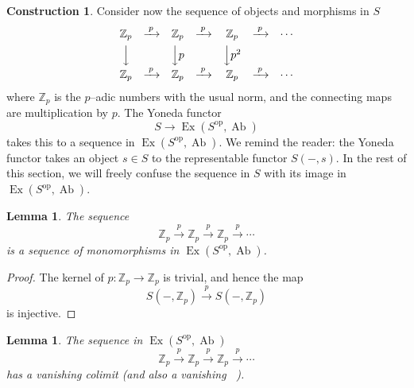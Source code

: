 \documentclass[11pt,a4paper]{article}
\theoremstyle{plain}
\newtheorem{lemma}[theorem]{Lemma}
\theoremstyle{definition}
\newtheorem{construction}[theorem]{Construction}
\DeclareMathOperator{\colim}{colim}
\DeclareMathOperator{\colimone}{\colim\nolimits^{1}}
\DeclareMathOperator{\Ex}{Ex}
\DeclareMathOperator{\Ab}{Ab}
\newcommand{\op}{\mathrm{op}}
\numberwithin{equation}{section}
\begin{document}
\begin{construction}\label{cons3.9}
Consider now the sequence of objects and morphisms in $S$
\begin{equation*}
\begin{array}{ccccccccc}
\mathbb{Z}_{p} & \xrightarrow{\;p\;} & \mathbb{Z}_{p} & \xrightarrow{\;p\;} & \mathbb{Z}_{p} & \xrightarrow{\;p\;} & \cdots \\[4pt]
\Big\downarrow & & \Big\downarrow p & & \Big\downarrow p^{2} \\[4pt]
\mathbb{Z}_{p} & \xrightarrow{\;p\;} & \mathbb{Z}_{p} & \xrightarrow{\;p\;} & \mathbb{Z}_{p} & \xrightarrow{\;p\;} & \cdots
\end{array}
\end{equation*}
where $\mathbb{Z}_{p}$ is the $p$--adic numbers with the usual norm, and the connecting maps are multiplication by $p$. The Yoneda functor
\begin{equation*}
S \longrightarrow \Ex(S^{\op},\Ab)
\end{equation*}
takes this to a sequence in $\Ex(S^{\op},\Ab)$. We remind the reader: the Yoneda functor takes an object $s \in S$ to the representable functor $S(-,s)$. In the rest of this section, we will freely confuse the sequence in $S$ with its image in $\Ex(S^{\op},\Ab)$.
\end{construction}

\begin{lemma}\label{lem3.10}
The sequence
\begin{equation*}
\mathbb{Z}_{p} \xrightarrow{\;p\;} \mathbb{Z}_{p} \xrightarrow{\;p\;} \mathbb{Z}_{p} \xrightarrow{\;p\;} \cdots
\end{equation*}
is a sequence of monomorphisms in $\Ex(S^{\op},\Ab)$.
\end{lemma}

\begin{proof}
The kernel of $p: \mathbb{Z}_{p} \to \mathbb{Z}_{p}$ is trivial, and hence the map
\begin{equation*}
S(-,\mathbb{Z}_{p}) \xrightarrow{\;p\;} S(-,\mathbb{Z}_{p})
\end{equation*}
is injective. \qedhere
\end{proof}

\begin{lemma}\label{lem3.11}
The sequence in $\Ex(S^{\op},\Ab)$
\begin{equation*}
\mathbb{Z}_{p} \xrightarrow{\;p\;} \mathbb{Z}_{p} \xrightarrow{\;p\;} \mathbb{Z}_{p} \xrightarrow{\;p\;} \cdots
\end{equation*}
has a vanishing colimit (and also a vanishing $\colimone$).
\end{lemma}
\end{document}
